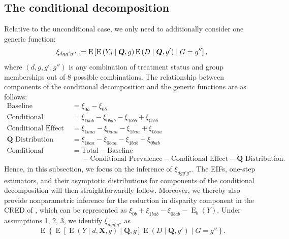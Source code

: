 \documentclass[12pt,a4paper]{article}
\newcommand{\E}{\operatorname{E}}
\def\X{{\boldsymbol X}}
\def\Q{{\boldsymbol Q}}
\newcommand{\defeq}{\vcentcolon=}
\begin{document}
\subsection{The conditional decomposition}
Relative to the unconditional case, we only need to additionally consider one generic function:
$$\xi_{dgg'g''} \defeq \E \left[\E \left(Y_d   \mid \Q, g \right) \E \left(D \mid \Q, g' \right) \mid G=g'' \right],$$
where $(d, g, g', g'')$ is any combination of treatment status and group memberships out of  8 possible combinations. The relationship between components of the conditional decomposition and the generic functions are as follows:
\begin{align*}
    \text{Baseline} &= \xi_{0a}-\xi_{0b}  \\
    \text{Conditional Prevalence} &= \xi_{1bab}-\xi_{0bab}-\xi_{1bbb}+\xi_{0bbb} \\
    \text{Conditional Effect} &= \xi_{1aaa}-\xi_{0aaa} - \xi_{1baa}+\xi_{0baa} \\
    \Q \text{ Distribution} &= \xi_{1baa}-\xi_{0baa} - \xi_{1bab}+\xi_{0bab} \\
    \text{Conditional Selection} &= \text{Total} - \text{Baseline} \\
    &\phantom{{}={}} - \text{Conditional Prevalence} - \text{Conditional Effect} - \Q \text{ Distribution}.
\end{align*}
Hence, in this subsection, we focus on the inference of $\xi_{dgg'g''}$. The EIFs,  one-step estimators, and their asymptotic distributions for components of the conditional decomposition will then straightforwardly follow. Moreover, we thereby also provide nonparametric inference for the reduction in disparity component in the CRED of \citet{jackson_meaningful_2021}, which can be represented as $\xi_{0b}+\xi_{1bab}-\xi_{0bab}-\E_b(Y)$.
Under assumptions 1, 2, 3, we identify $\xi_{dgg'g''}$ as $$\E \left\{\E \left[ \E(Y \mid d,\X,g)   \mid \Q, g \right] \E \left(D \mid \Q, g' \right) \mid G=g'' \right\}.$$
\end{document}
